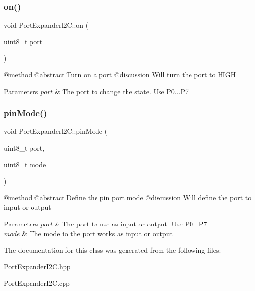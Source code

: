 \subsubsection{\texorpdfstring{on()}{on()}}
{\footnotesize\ttfamily void Port\+Expander\+I2\+C\+::on (\begin{DoxyParamCaption}\item[{uint8\+\_\+t}]{port }\end{DoxyParamCaption})}

@method @abstract Turn on a port @discussion Will turn the port to H\+I\+GH 
\begin{DoxyParams}{Parameters}
{\em port} & The port to change the state. Use P0...P7 \\
\hline
\end{DoxyParams}
\mbox{\label{classPortExpanderI2C_ab3ddb549621ef8622af037eed5171b71}} 
\subsubsection{\texorpdfstring{pinMode()}{pinMode()}}
{\footnotesize\ttfamily void Port\+Expander\+I2\+C\+::pin\+Mode (\begin{DoxyParamCaption}\item[{uint8\+\_\+t}]{port,  }\item[{uint8\+\_\+t}]{mode }\end{DoxyParamCaption})}

@method @abstract Define the pin port mode @discussion Will define the port to input or output 
\begin{DoxyParams}{Parameters}
{\em port} & The port to use as input or output. Use P0...P7 \\
\hline
{\em mode} & The mode to the port works as input or output \\
\hline
\end{DoxyParams}


The documentation for this class was generated from the following files\+:\begin{DoxyCompactItemize}
\item 
Port\+Expander\+I2\+C.\+hpp\item 
Port\+Expander\+I2\+C.\+cpp\end{DoxyCompactItemize}
